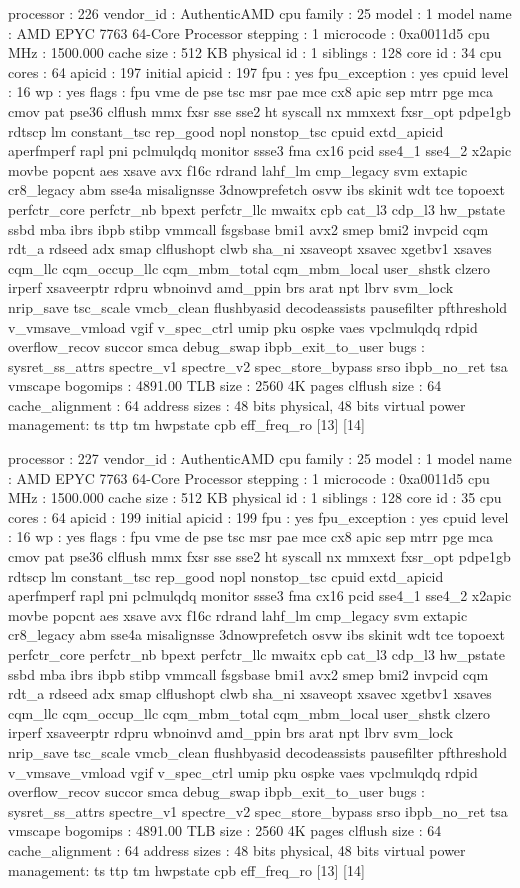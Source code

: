 processor	: 226
vendor_id	: AuthenticAMD
cpu family	: 25
model		: 1
model name	: AMD EPYC 7763 64-Core Processor
stepping	: 1
microcode	: 0xa0011d5
cpu MHz		: 1500.000
cache size	: 512 KB
physical id	: 1
siblings	: 128
core id		: 34
cpu cores	: 64
apicid		: 197
initial apicid	: 197
fpu		: yes
fpu_exception	: yes
cpuid level	: 16
wp		: yes
flags		: fpu vme de pse tsc msr pae mce cx8 apic sep mtrr pge mca cmov pat pse36 clflush mmx fxsr sse sse2 ht syscall nx mmxext fxsr_opt pdpe1gb rdtscp lm constant_tsc rep_good nopl nonstop_tsc cpuid extd_apicid aperfmperf rapl pni pclmulqdq monitor ssse3 fma cx16 pcid sse4_1 sse4_2 x2apic movbe popcnt aes xsave avx f16c rdrand lahf_lm cmp_legacy svm extapic cr8_legacy abm sse4a misalignsse 3dnowprefetch osvw ibs skinit wdt tce topoext perfctr_core perfctr_nb bpext perfctr_llc mwaitx cpb cat_l3 cdp_l3 hw_pstate ssbd mba ibrs ibpb stibp vmmcall fsgsbase bmi1 avx2 smep bmi2 invpcid cqm rdt_a rdseed adx smap clflushopt clwb sha_ni xsaveopt xsavec xgetbv1 xsaves cqm_llc cqm_occup_llc cqm_mbm_total cqm_mbm_local user_shstk clzero irperf xsaveerptr rdpru wbnoinvd amd_ppin brs arat npt lbrv svm_lock nrip_save tsc_scale vmcb_clean flushbyasid decodeassists pausefilter pfthreshold v_vmsave_vmload vgif v_spec_ctrl umip pku ospke vaes vpclmulqdq rdpid overflow_recov succor smca debug_swap ibpb_exit_to_user
bugs		: sysret_ss_attrs spectre_v1 spectre_v2 spec_store_bypass srso ibpb_no_ret tsa vmscape
bogomips	: 4891.00
TLB size	: 2560 4K pages
clflush size	: 64
cache_alignment	: 64
address sizes	: 48 bits physical, 48 bits virtual
power management: ts ttp tm hwpstate cpb eff_freq_ro [13] [14]

processor	: 227
vendor_id	: AuthenticAMD
cpu family	: 25
model		: 1
model name	: AMD EPYC 7763 64-Core Processor
stepping	: 1
microcode	: 0xa0011d5
cpu MHz		: 1500.000
cache size	: 512 KB
physical id	: 1
siblings	: 128
core id		: 35
cpu cores	: 64
apicid		: 199
initial apicid	: 199
fpu		: yes
fpu_exception	: yes
cpuid level	: 16
wp		: yes
flags		: fpu vme de pse tsc msr pae mce cx8 apic sep mtrr pge mca cmov pat pse36 clflush mmx fxsr sse sse2 ht syscall nx mmxext fxsr_opt pdpe1gb rdtscp lm constant_tsc rep_good nopl nonstop_tsc cpuid extd_apicid aperfmperf rapl pni pclmulqdq monitor ssse3 fma cx16 pcid sse4_1 sse4_2 x2apic movbe popcnt aes xsave avx f16c rdrand lahf_lm cmp_legacy svm extapic cr8_legacy abm sse4a misalignsse 3dnowprefetch osvw ibs skinit wdt tce topoext perfctr_core perfctr_nb bpext perfctr_llc mwaitx cpb cat_l3 cdp_l3 hw_pstate ssbd mba ibrs ibpb stibp vmmcall fsgsbase bmi1 avx2 smep bmi2 invpcid cqm rdt_a rdseed adx smap clflushopt clwb sha_ni xsaveopt xsavec xgetbv1 xsaves cqm_llc cqm_occup_llc cqm_mbm_total cqm_mbm_local user_shstk clzero irperf xsaveerptr rdpru wbnoinvd amd_ppin brs arat npt lbrv svm_lock nrip_save tsc_scale vmcb_clean flushbyasid decodeassists pausefilter pfthreshold v_vmsave_vmload vgif v_spec_ctrl umip pku ospke vaes vpclmulqdq rdpid overflow_recov succor smca debug_swap ibpb_exit_to_user
bugs		: sysret_ss_attrs spectre_v1 spectre_v2 spec_store_bypass srso ibpb_no_ret tsa vmscape
bogomips	: 4891.00
TLB size	: 2560 4K pages
clflush size	: 64
cache_alignment	: 64
address sizes	: 48 bits physical, 48 bits virtual
power management: ts ttp tm hwpstate cpb eff_freq_ro [13] [14]

